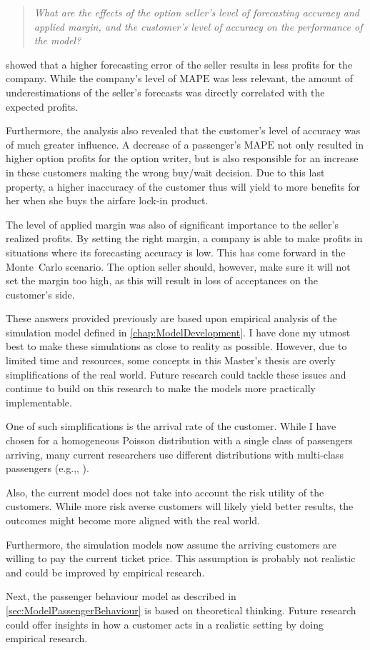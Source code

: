 \begin{quote}\emph{What are the effects of the option seller's level of forecasting accuracy and applied margin, and the customer's level of accuracy on the performance of the model?}\end{quote}

 showed that a higher forecasting error of the seller results in less profits for the company. While the company's level of $\mbox{MAPE}$ was less relevant, the amount of underestimations of the seller's forecasts was directly correlated with the expected profits.

Furthermore, the analysis also revealed that the customer's level of accuracy was of much greater influence. A decrease of a passenger's $\mbox{MAPE}$ not only resulted in higher option profits for the option writer, but is also responsible for an increase in these customers making the wrong buy/wait decision. Due to this last property, a higher inaccuracy of the customer thus will yield to more benefits for her when she buys the airfare lock-in product.

The level of applied margin was also of significant importance to the seller's realized profits. By setting the right margin, a company is able to make profits in situations where its forecasting accuracy is low. This has come forward in the Monte~Carlo scenario. The option seller should, however, make sure it will not set the margin too high, as this will result in loss of acceptances on the customer's side.

These answers provided previously are based upon empirical analysis of the simulation model defined in \autoref{chap:ModelDevelopment}. I have done my utmost best to make these simulations as close to reality as possible. However, due to limited time and resources, some concepts in this Master's thesis are overly simplifications of the real world. Future research could tackle these issues and continue to build on this research to make the models more practically implementable.

One of such simplifications is the arrival rate of the customer. While I have chosen for a homogeneous Poisson distribution with a single class of passengers arriving, many current researchers use different distributions with multi-class passengers (e.g.,, ).

Also, the current model does not take into account the risk utility of the customers. While more risk averse customers will likely yield better results, the outcomes might become more aligned with the real world.

Furthermore, the simulation models now assume the arriving customers are willing to pay the current ticket price. This assumption is probably not realistic and could be improved by empirical research.

Next, the passenger behaviour model as described in \autoref{sec:ModelPassengerBehaviour} is based on theoretical thinking. Future research could offer insights in how a customer acts in a realistic setting by doing empirical research.


